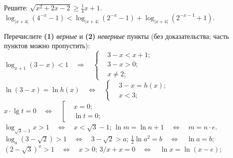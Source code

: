%
%



\begin{problems}

\item
Решите:
\qquad
\sbp $\sqrt{x^2 + 2 x - 2} \geq \frac{1}{4} x + 1$.
\\[0.5ex]
\sbp
\(
    \log_{|x + 4|} (4^{-x} - 1)
    <
    \log_{|x + 4|} (2^{-x} - 1)
    +
    \log_{|x + 4|} (2^{-x - 1} + 1)
\).

\item
Перечислите \textbf{(1)} \emph{верные} и \textbf{(2)} \emph{неверные} пункты
(без доказательства; часть пунктов можно пропустить):
\\%
\sbp
\(
    \log_{x + 1} (3 - x) < 1
\quad\Rightarrow\quad
    \left\{\begin{aligned}
        & 3 - x < x + 1 ; \\
        & 3 - x > 0 ; \\
        & x \neq 2 ;
    \end{aligned}\right.
\)
\\[1ex]%
\sbp
\(
    \ln (3 - x) = \ln h(x)
\quad\Leftrightarrow\quad
    \left\{\begin{aligned}
        & 3 - x = h(x) ; \\
        & x < 3 ;
    \end{aligned}\right.
\)
\\[1ex]%
\sbp
\(
    x \cdot \lg t = 0
\quad\Leftrightarrow\quad
    \left[\begin{aligned}
        & x = 0 ; \\
        & \ln t = 0 ;
    \end{aligned}\right.
\)
\\[0.5ex] %
\sbp $\log_{\sqrt{3} - 1} x > 1 \quad\Leftrightarrow\quad x < \sqrt{3} - 1$;
\qquad %
\sbp $\ln m = \ln n + 1 \quad\Leftrightarrow\quad m = n \cdot e$.
\\[0.5ex] %
\sbp $\log_a (3 - \sqrt{2}) > 1 \quad\Leftrightarrow\quad 3 - \sqrt{2} > a$;
\qquad %
\sbp $\frac{1}{2} \ln a^2 = b \quad\Leftrightarrow\quad \ln a = b$;
\\[0.5ex] %
\sbp $(2 - \sqrt{3})^x > 1 \quad\Leftrightarrow\quad x > 0$;
\qquad %
\sbp $3/x + x = 0 \quad\Leftrightarrow\quad \ln x = \ln (x - e)$;

\end{problems}


